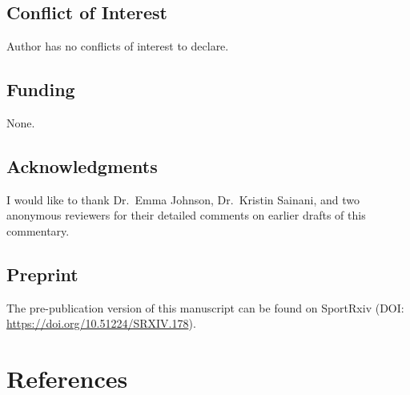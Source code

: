 \documentclass[]{cik}%
\begin{document}
\hypertarget{conflict-of-interest}{%
\subsection{Conflict of Interest}\label{conflict-of-interest}}

Author has no conflicts of interest to declare.

\hypertarget{funding}{%
\subsection{Funding}\label{funding}}

None.

\hypertarget{acknowledgments}{%
\subsection{Acknowledgments}\label{acknowledgments}}

I would like to thank Dr.~Emma Johnson, Dr.~Kristin Sainani, and two
anonymous reviewers for their detailed comments on earlier drafts of
this commentary.

\hypertarget{preprint}{%
\subsection{Preprint}\label{preprint}}

The pre-publication version of this manuscript can be found on SportRxiv
(DOI: \url{https://doi.org/10.51224/SRXIV.178}).

\newpage

\hypertarget{references}{%
\section{References}\label{references}}

\parindent0pt 
\setlength{\parskip}{1em}
\end{document}
